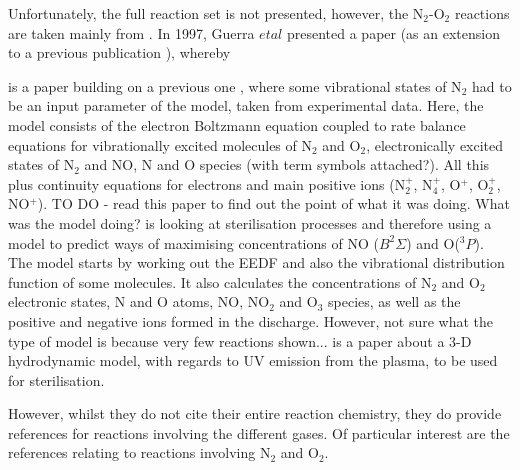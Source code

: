 \documentclass[11pt, oneside]{article}   	%
\begin{document}
Unfortunately, the full reaction set is not presented, however, the N$_2$-O$_2$ reactions are taken mainly from \cite{Guerra1997self, Pintassilgo2005modelling, Kutasi2008modelling}.
In 1997, Guerra $et al$ \cite{Guerra1997self} presented a paper (as an extension to a previous publication \cite{Guerra1995non}), whereby 


is a paper building on a previous one \cite{Guerra1995non}, where some vibrational states of N$_2$ had to be an input parameter of the model, taken from experimental data. Here, the model consists of the electron Boltzmann equation coupled to rate balance equations for vibrationally excited molecules of N$_2$ and O$_2$, electronically excited states of N$_2$ and NO, N and O species (with term symbols attached?). All this plus continuity equations for electrons and main positive ions (N$_2^+$, N$_4^+$, O$^+$, O$_2^+$, NO$^+$). TO DO - read this paper to find out the point of what it was doing. What was the model doing? 
\cite{Pintassilgo2005modelling} is looking at sterilisation processes and therefore using a model to predict ways of maximising concentrations of NO ($B ^2\Sigma$) and O($^3P$). 
The model starts by working out the EEDF and also the vibrational distribution function of some molecules. 
It also calculates the concentrations of N$_2$ and O$_2$ electronic states, N and O atoms, NO, NO$_2$ and O$_3$ species, as well as the positive and negative ions formed in the discharge. However, not sure what the type of model is because very few reactions shown...
\cite{Kutasi2008modelling} is a paper about a 3-D hydrodynamic model, with regards to UV emission from the plasma, to be used for sterilisation.

However, whilst they do not cite their entire reaction chemistry, they do provide references for reactions involving the different gases. Of particular interest are the references relating to reactions involving N$_2$ and O$_2$.
\end{document}
